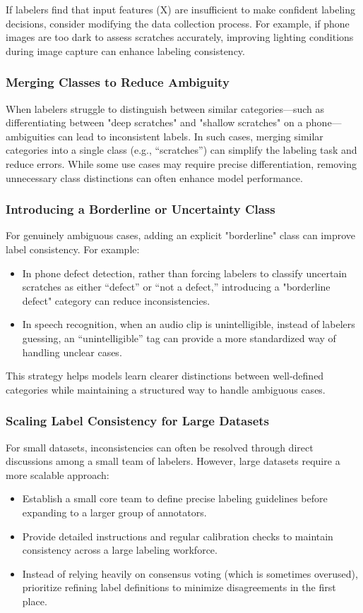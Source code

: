 \documentclass[12pt,openany, draft]{book}
\begin{document}
If labelers find that input features (X) are insufficient to make confident labeling decisions, consider modifying the data collection process. For example, if phone images are too dark to assess scratches accurately, improving lighting conditions during image capture can enhance labeling consistency.

\subsubsection{Merging Classes to Reduce Ambiguity}
When labelers struggle to distinguish between similar categories—such as differentiating between "deep scratches" and "shallow scratches" on a phone—ambiguities can lead to inconsistent labels. In such cases, merging similar categories into a single class (e.g., “scratches”) can simplify the labeling task and reduce errors. While some use cases may require precise differentiation, removing unnecessary class distinctions can often enhance model performance.

\subsubsection{Introducing a Borderline or Uncertainty Class}
For genuinely ambiguous cases, adding an explicit "borderline" class can improve label consistency. For example:
\begin{itemize}
    \item In phone defect detection, rather than forcing labelers to classify uncertain scratches as either “defect” or “not a defect,” introducing a "borderline defect" category can reduce inconsistencies.
    \item In speech recognition, when an audio clip is unintelligible, instead of labelers guessing, an “unintelligible” tag can provide a more standardized way of handling unclear cases.
\end{itemize}

This strategy helps models learn clearer distinctions between well-defined categories while maintaining a structured way to handle ambiguous cases.

\subsubsection{Scaling Label Consistency for Large Datasets}
For small datasets, inconsistencies can often be resolved through direct discussions among a small team of labelers. However, large datasets require a more scalable approach:
\begin{itemize}
    \item Establish a small core team to define precise labeling guidelines before expanding to a larger group of annotators.
    \item Provide detailed instructions and regular calibration checks to maintain consistency across a large labeling workforce.
    \item Instead of relying heavily on consensus voting (which is sometimes overused), prioritize refining label definitions to minimize disagreements in the first place.
\end{itemize}
\end{document}
